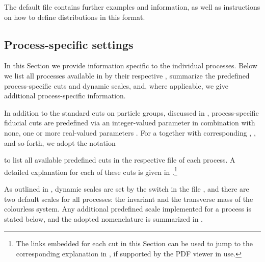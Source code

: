 \documentclass[english,11pt]{article}
\begin{document}
The default file  contains further examples and information, as well as instructions on how 
to define distributions in this format.


\subsection{Process-specific settings}
\label{sec:processes}


In this Section we provide information specific to the individual processes. Below we list all processes available in \Matrix{} by their
respective , summarize the predefined process-specific cuts and dynamic 
scales, and, where applicable, we give additional process-specific information.

In addition to the standard cuts on particle groups, discussed in , process-specific fiducial cuts are 
predefined via an integer-valued parameter  
in combination with none, one or more real-valued parameters . For a  
together with corresponding ,  , and so forth, we adopt the notation


to list all available predefined cuts in the respective file  of each process. A detailed explanation for each of these cuts is 
given in .\footnote{The links embedded for each cut in this Section can be used to jump to the corresponding explanation in , if supported by the PDF viewer in use.}


As outlined in , dynamic scales are set by the switch 
 in the file , and there are two default scales for all processes: the 
invariant and the transverse mass of the colourless system. Any additional predefined scale implemented for a process is stated below, 
and the adopted nomenclature is summarized in .
\renewcommand\arraystretch{1.1}
\end{document}
